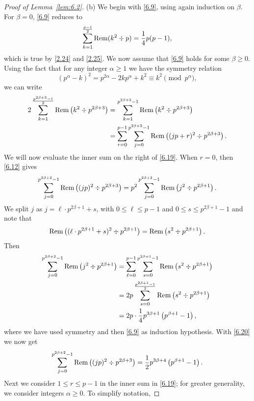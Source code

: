 \documentclass{amsart}
\theoremstyle{plain}
\numberwithin{equation}{section}
\begin{document}
\begin{proof}[Proof of Lemma~\ref{lem:6.2}]
(b) We begin with \eqref{6.9}, using again induction on $\beta$. For $\beta=0$,
\eqref{6.9} reduces to 
\begin{equation}\label{6.18a}
\sum_{k=1}^{\frac{p-1}{2}}{\rm Rem}(k^2\div p)=\frac{1}{4}p(p-1),
\end{equation}
which is true by \eqref{2.24} and \eqref{2.25}. We now assume that \eqref{6.9}
holds for some $\beta\geq 0$. Using the fact that for any integer $\alpha\geq 1$
we have the symmetry relation
\[
\left(p^{\alpha}-k\right)^2 = p^{2\alpha}-2kp^{\alpha}+k^2
\equiv k^2\pmod{p^{\alpha}},
\]
we can write
\begin{align}
2\sum_{k=1}^{\frac{p^{2\beta+3}-1}{2}}{\rm Rem}\left(k^2\div p^{2\beta+3}\right)
&=\sum_{k=1}^{p^{2\beta+3}-1}{\rm Rem}\left(k^2\div p^{2\beta+3}\right)\label{6.19}\\
&=\sum_{r=0}^{p-1}\sum_{j=0}^{p^{2\beta+2}-1}
{\rm Rem}\left((jp+r)^2\div p^{2\beta+3}\right).\nonumber
\end{align}
We will now evaluate the inner sum on the right of \eqref{6.19}. When $r=0$,
then \eqref{6.12} gives
\begin{equation}\label{6.20}
\sum_{j=0}^{p^{2\beta+2}-1}{\rm Rem}\left((jp)^2\div p^{2\beta+3}\right)
=p^2\sum_{j=0}^{p^{2\beta+2}-1}{\rm Rem}\left(j^2\div p^{2\beta+1}\right).
\end{equation}
We split $j$ as $j=\ell\cdot p^{2\beta+1}+s$, with $0\leq\ell\leq p-1$ and
$0\leq s\leq p^{2\beta+1}-1$ and note that
\[
{\rm Rem}\left((\ell\cdot p^{2\beta+1}+s)^2\div p^{2\beta+1}\right)
={\rm Rem}\left(s^2\div p^{2\beta+1}\right).
\]
Then
\begin{align*}
\sum_{j=0}^{p^{2\beta+2}-1}{\rm Rem}\left(j^2\div p^{2\beta+1}\right)
&=\sum_{\ell=0}^{p-1}\sum_{s=0}^{p^{2\beta+1}-1}
{\rm Rem}\left(s^2\div p^{2\beta+1}\right) \\
&=2p\sum_{s=0}^{\frac{p^{2\beta+1}-1}{2}}
{\rm Rem}\left(s^2\div p^{2\beta+1}\right) \\
&= 2p\cdot\frac{1}{4}p^{3\beta+1}\left(p^{\beta+1}-1\right),
\end{align*}
where we have used symmetry and then \eqref{6.9} as induction hypothesis.
With \eqref{6.20} we now get
\begin{equation}\label{6.21}
\sum_{j=0}^{p^{2\beta+2}-1}{\rm Rem}\left((jp)^2\div p^{2\beta+3}\right)
= \frac{1}{2}p^{3\beta+4}\left(p^{\beta+1}-1\right).
\end{equation}
Next we consider $1\leq r\leq p-1$ in the inner sum in \eqref{6.19}; for 
greater generality, we consider integers $\alpha\geq 0$. To simplify notation,

\end{proof}
\end{document}

